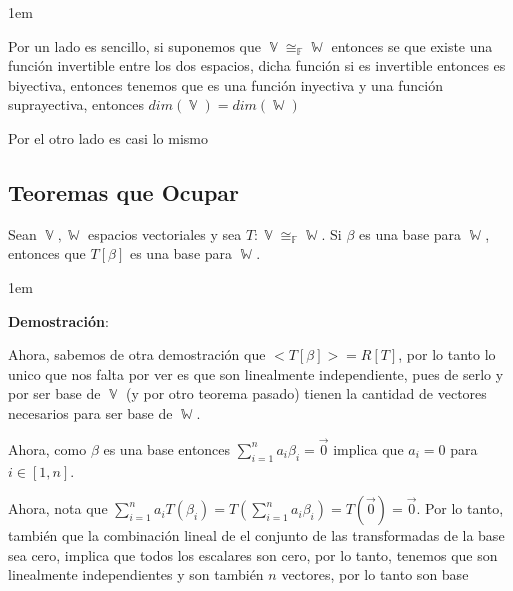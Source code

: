 \documentclass[12pt, fleqn]{article}                             %
\newenvironment{SmallIndentation}[1][0.75em]                    %
        {\begin{adjustwidth}{#1}{}\begin{footnotesize}}             %
        {\end{footnotesize}\end{adjustwidth}}                       %
\theoremstyle{break}                                            %
\DeclareMathOperator \GenericField {\mathbb{F}}                 %
\DeclareMathOperator \VectorSet    {\mathbb{V}}                 %
\DeclareMathOperator \SubVectorSet {\mathbb{W}}                 %
\begin{document}
\begin{itemize}
\begin{SmallIndentation}[1em]
                    Por un lado es sencillo, si suponemos que $\VectorSet \cong_{\GenericField} \SubVectorSet$
                    entonces se que existe una función invertible entre los dos espacios, dicha
                    función si es invertible entonces es biyectiva, entonces tenemos que
                    es una función inyectiva y una función suprayectiva, entonces
                    $dim(\VectorSet) = dim(\SubVectorSet)$

                    Por el otro lado es casi lo mismo
                
                \end{SmallIndentation}



        \end{itemize}

    \vspace{1em}
    \subsection{Teoremas que Ocupar}

        Sean $\VectorSet, \SubVectorSet$ espacios vectoriales y sea 
        $T: \VectorSet \cong_{\GenericField} \SubVectorSet$. Si $\beta$ es una base
        para $\SubVectorSet$, entonces que $T[\beta]$ es una base para $\SubVectorSet$.

        \begin{SmallIndentation}[1em]
            \textbf{Demostración}:
            
            Ahora, sabemos de otra demostración que $<T[\beta]> = R[T]$, por lo tanto lo unico que nos
            falta por ver es que son linealmente independiente, pues de serlo y por ser base de $\VectorSet$
            (y por otro teorema pasado) tienen la cantidad de vectores necesarios para ser base
            de $\SubVectorSet$.

            Ahora, como $\beta$ es una base entonces $\sum_{i=1}^n a_i \beta_i = \vec 0$ implica
            que $a_i = 0$ para $i \in [1, n]$.

            Ahora, nota que $\sum_{i=1}^n a_i T(\beta_i) = T(\sum_{i=1}^n a_i \beta_i) = T(\vec 0) = \vec 0$.
            Por lo tanto, también que la combinación lineal de el conjunto de las transformadas de la base
            sea cero, implica que todos los escalares son cero, por lo tanto, tenemos que son linealmente
            independientes y son también $n$ vectores, por lo tanto son base  
        
        \end{SmallIndentation}
\end{document}
